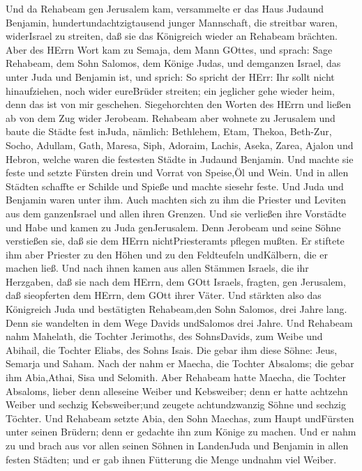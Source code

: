  Und da Rehabeam gen Jerusalem kam, versammelte er das Haus
Judaund Benjamin, hundertundachtzigtausend junger Mannschaft, die
streitbar waren, widerIsrael zu streiten, daß sie das Königreich wieder
an Rehabeam brächten.  Aber des HErrn Wort kam zu Semaja,
dem Mann GOttes, und sprach:  Sage Rehabeam, dem Sohn
Salomos, dem Könige Judas, und demganzen Israel, das unter Juda und
Benjamin ist, und sprich:  So spricht der HErr: Ihr sollt
nicht hinaufziehen, noch wider eureBrüder streiten; ein jeglicher gehe
wieder heim, denn das ist von mir geschehen. Siegehorchten den Worten
des HErrn und ließen ab von dem Zug wider Jerobeam. 
Rehabeam aber wohnete zu Jerusalem und baute die Städte fest inJuda,
 nämlich: Bethlehem, Etam, Thekoa,  Beth-Zur,
Socho, Adullam,  Gath, Maresa, Siph,  Adoraim,
Lachis, Aseka,  Zarea, Ajalon und Hebron, welche waren die
festesten Städte in Judaund Benjamin.  Und machte sie feste
und setzte Fürsten drein und Vorrat von Speise,Öl und Wein.
 Und in allen Städten schaffte er Schilde und Spieße und
machte siesehr feste. Und Juda und Benjamin waren unter ihm.
 Auch machten sich zu ihm die Priester und Leviten aus dem
ganzenIsrael und allen ihren Grenzen.  Und sie verließen
ihre Vorstädte und Habe und kamen zu Juda genJerusalem. Denn Jerobeam
und seine Söhne verstießen sie, daß sie dem HErrn nichtPriesteramts
pflegen mußten.  Er stiftete ihm aber Priester zu den Höhen
und zu den Feldteufeln undKälbern, die er machen ließ.  Und
nach ihnen kamen aus allen Stämmen Israels, die ihr Herzgaben, daß sie
nach dem HErrn, dem GOtt Israels, fragten, gen Jerusalem, daß
sieopferten dem HErrn, dem GOtt ihrer Väter.  Und stärkten
also das Königreich Juda und bestätigten Rehabeam,den Sohn Salomos, drei
Jahre lang. Denn sie wandelten in dem Wege Davids undSalomos drei Jahre.
 Und Rehabeam nahm Mahelath, die Tochter Jerimoths, des
SohnsDavids, zum Weibe und Abihail, die Tochter Eliabs, des Sohns Isais.
 Die gebar ihm diese Söhne: Jeus, Semarja und Saham.
 Nach der nahm er Maecha, die Tochter Absaloms; die gebar
ihm Abia,Athai, Sisa und Selomith.  Aber Rehabeam hatte
Maecha, die Tochter Absaloms, lieber denn alleseine Weiber und
Kebsweiber; denn er hatte achtzehn Weiber und sechzig Kebsweiber;und
zeugete achtundzwanzig Söhne und sechzig Töchter.  Und
Rehabeam setzte Abia, den Sohn Maechas, zum Haupt undFürsten unter
seinen Brüdern; denn er gedachte ihn zum Könige zu machen. 
Und er nahm zu und brach aus vor allen seinen Söhnen in LandenJuda und
Benjamin in allen festen Städten; und er gab ihnen Fütterung die Menge
undnahm viel Weiber.

